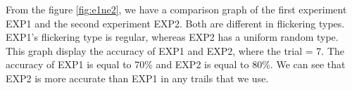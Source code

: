 From the figure \ref{fig:e1ne2}, we have a comparison graph of the first experiment EXP1 and the second experiment EXP2. Both are different in flickering types. EXP1's flickering type is regular, whereas EXP2 has a uniform random type. This graph display the accuracy of EXP1 and EXP2, where the trial = 7. The accuracy of EXP1 is equal to 70\% and EXP2 is equal to 80\%. We can see that EXP2 is more accurate than EXP1 in any trails that we use.


\begin{table}[ht]
\centering
{}
\caption{Experiment result}
\label{table:result1}
\end{table}

